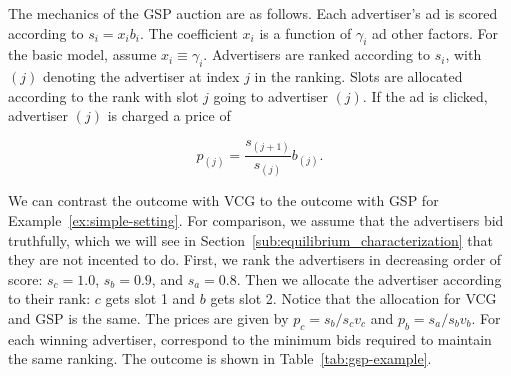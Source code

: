 \documentclass[prodmode,acmtist]{acmsmall} %
\begin{document}
\begin{table}[htbp]%
\end{table}%

The mechanics of the GSP auction are as follows.  
Each advertiser's ad is scored according to $s_i = x_i b_i$.
The coefficient $x_i$ is a function of $\gamma_i$ ad other factors.
For the basic model, assume $x_i \equiv \gamma_i$.
Advertisers are ranked according to $s_i$, with $(j)$ denoting the advertiser at index $j$ in the ranking.  
Slots are allocated according to the rank with slot $j$ going to advertiser $(j)$.  
If the ad is clicked, advertiser $(j)$ is charged a price of 

\begin{equation}
p_{(j)} = \frac{s_{(j+1)}}{s_{(j)}} b_{(j)}.	
\label{eqn:gsp-price}
\end{equation}

We can contrast the outcome with VCG to the outcome with GSP for Example~\ref{ex:simple-setting}.
For comparison, we assume that the advertisers bid truthfully, which we will see in Section~\ref{sub:equilibrium_characterization} that they are not incented to do.
First, we rank the advertisers in decreasing order of score: $s_c=1.0$, $s_b= 0.9$, and $s_a = 0.8$.
Then we allocate the advertiser according to their rank: $c$ gets slot 1 and $b$ gets slot 2.
Notice that the allocation for VCG and GSP is the same.
The prices are given by $p_c = s_b/s_c v_c$ and $p_b = s_a/s_b v_b$.
For each winning advertiser, correspond to the minimum bids required to maintain the same ranking.
The outcome is shown in Table~\ref{tab:gsp-example}.

\begin{table}[htbp]%
\end{table}%
\end{document}
